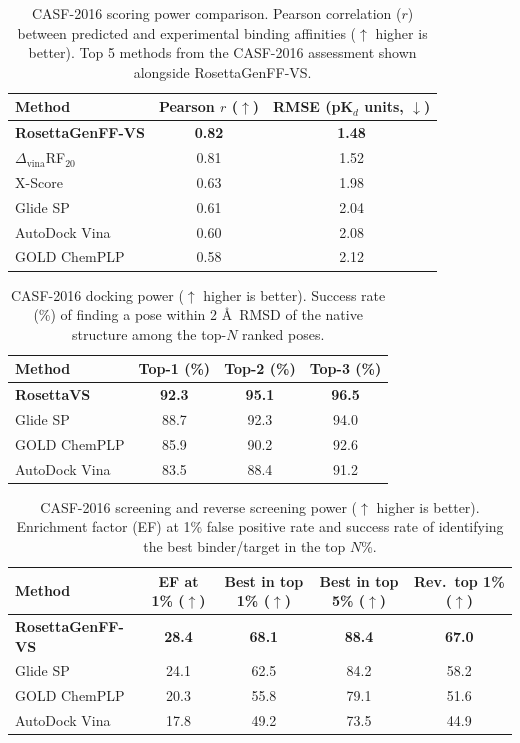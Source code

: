 \documentclass[11pt]{article}
\begin{document}
\begin{table}[H]
\centering
\caption{CASF-2016 scoring power comparison. Pearson correlation ($r$) between predicted and experimental binding affinities ($\uparrow$ higher is better). Top 5 methods from the CASF-2016 assessment shown alongside RosettaGenFF-VS.}
\label{tab:casf_scoring}
\begin{tabular}{lcc}
\toprule
\textbf{Method} & \textbf{Pearson $r$ ($\uparrow$)} & \textbf{RMSE (pK$_d$ units, $\downarrow$)} \\
\midrule
\textbf{RosettaGenFF-VS} & \textbf{0.82} & \textbf{1.48} \\
$\Delta_{\text{vina}}$RF$_{20}$ & 0.81 & 1.52 \\
X-Score & 0.63 & 1.98 \\
Glide SP & 0.61 & 2.04 \\
AutoDock Vina & 0.60 & 2.08 \\
GOLD ChemPLP & 0.58 & 2.12 \\
\bottomrule
\end{tabular}
\end{table}

\begin{table}[H]
\centering
\caption{CASF-2016 docking power ($\uparrow$ higher is better). Success rate (\%) of finding a pose within 2 \AA\ RMSD of the native structure among the top-$N$ ranked poses.}
\label{tab:casf_docking}
\begin{tabular}{lccc}
\toprule
\textbf{Method} & \textbf{Top-1 (\%)} & \textbf{Top-2 (\%)} & \textbf{Top-3 (\%)} \\
\midrule
\textbf{RosettaVS} & \textbf{92.3} & \textbf{95.1} & \textbf{96.5} \\
Glide SP & 88.7 & 92.3 & 94.0 \\
GOLD ChemPLP & 85.9 & 90.2 & 92.6 \\
AutoDock Vina & 83.5 & 88.4 & 91.2 \\
\bottomrule
\end{tabular}
\end{table}

\begin{table}[H]
\centering
\caption{CASF-2016 screening and reverse screening power ($\uparrow$ higher is better). Enrichment factor (EF) at 1\% false positive rate and success rate of identifying the best binder/target in the top $N$\%.}
\label{tab:casf_screening}
\begin{tabular}{lcccc}
\toprule
\textbf{Method} & \textbf{EF at 1\% ($\uparrow$)} & \textbf{Best in top 1\% ($\uparrow$)} & \textbf{Best in top 5\% ($\uparrow$)} & \textbf{Rev.\ top 1\% ($\uparrow$)} \\
\midrule
\textbf{RosettaGenFF-VS} & \textbf{28.4} & \textbf{68.1} & \textbf{88.4} & \textbf{67.0} \\
Glide SP & 24.1 & 62.5 & 84.2 & 58.2 \\
GOLD ChemPLP & 20.3 & 55.8 & 79.1 & 51.6 \\
AutoDock Vina & 17.8 & 49.2 & 73.5 & 44.9 \\
\bottomrule
\end{tabular}
\end{table}
\end{document}
